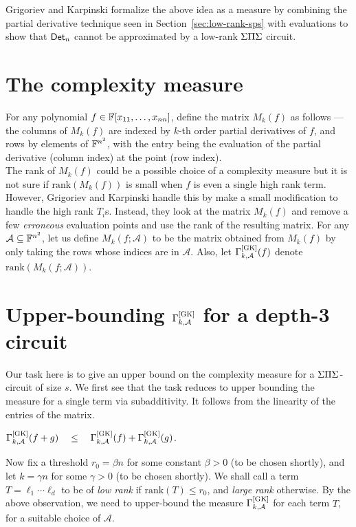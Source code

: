 Grigoriev and Karpinski \cite{grigoriev98} formalize the above idea as a measure by combining the partial derivative technique seen in Section~\ref{sec:low-rank-sps} with evaluations to show that $\mathsf{Det}_n$ cannot be approximated by a low-rank $\Sigma\Pi\Sigma$ circuit.

\section{The complexity measure}

For any polynomial $f \in \mathbb{F}[x_{11},\dots, x_{nn}]$, define the matrix $M_k(f)$ as follows --- the columns of $M_k(f)$ are indexed by $k$-th order partial derivatives of $f$, and rows by elements of $\mathbb{F}^{n^2}$, with the entry being the evaluation of the partial derivative (column
index) at the point (row index).\\

The rank of $M_k(f)$ could be a possible choice of a complexity measure but it is not sure if $\mathrm{rank}(M_k(f))$ is small when $f$ is even a single high rank term. However,  Grigoriev and Karpinski handle this by make a small modification to handle the high rank $T_i$s. Instead, they look at the matrix $M_k(f)$ and remove a few \emph{erroneous} evaluation points and use the rank of the resulting matrix. For any $\mathcal{A}\subseteq \mathbb{F}^{n^2}$, let us define $M_k(f;\mathcal{A})$ to be the matrix obtained from $M_k(f)$ by only taking the rows whose indices are in $\mathcal{A}$. Also, let $\Gamma^{\mathrm{[GK]}}_{k,\mathcal{A}}(f)$ denote $\mathrm{rank}(M_k(f;\mathcal{A}))$.



\section{Upper-bounding $\Gamma^{\mathrm{[GK]}}_{k,\mathcal{A}}$ for a depth-3 circuit}\label{sec:gk-upper-bound}

Our task here is to give an upper bound on the complexity measure for a $\Sigma\Pi\Sigma$-circuit of size $s$. We first see that the task reduces to upper bounding the measure for a single term via subadditivity. It follows from the linearity of the entries of the matrix.

\begin{observation}\label{obs:GK-subadditivity}
  $\Gamma^{\mathrm{[GK]}}_{k,\mathcal{A}}(f + g) \quad\leq\quad \Gamma^{\mathrm{[GK]}}_{k,\mathcal{A}}(f) + \Gamma^{\mathrm{[GK]}}_{k,\mathcal{A}}(g)$.
\end{observation}

Now fix a threshold $r_0 = \beta n$ for some constant $\beta > 0$ (to be chosen shortly), and let $k = \gamma n$ for some $\gamma>0$ (to be chosen shortly). We shall call a term $T = \ell_1\cdots \ell_d$ to be of \emph{low rank} if $\mathrm{rank}(T) \leq r_0$, and \emph{large rank} otherwise. By the above observation, we need to upper-bound the measure $\Gamma^{\mathrm{[GK]}}_{k,\mathcal{A}}$ for each term $T$, for a
suitable choice of $\mathcal{A}$.\\

